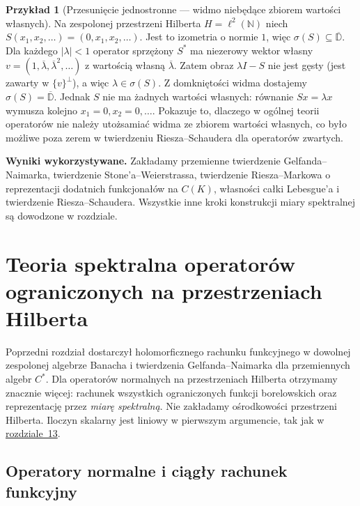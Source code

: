 \documentclass[11pt,a4paper]{article}
\numberwithin{equation}{section}
\theoremstyle{plain}
\theoremstyle{definition}
\newtheorem{przyklad}[twierdzenie]{Przykład}
\theoremstyle{remark}
\newcommand{\N}{\mathbb N}
\begin{document}
\begin{przyklad}[Przesunięcie jednostronne — widmo niebędące zbiorem wartości własnych]
\label{ex:unilateral-shift31}
Na zespolonej przestrzeni Hilberta $H=\ell^2(\N)$ niech
$S(x_1,x_2,\ldots)=(0,x_1,x_2,\ldots)$.
Jest to izometria o normie $1$, więc $\sigma(S)\subseteq\overline{\mathbb D}$.
Dla każdego $|\lambda|<1$ operator sprzężony $S^*$ ma niezerowy
wektor własny $v=(1,\overline\lambda,\overline\lambda^2,\ldots)$
z wartością własną $\overline\lambda$.
Zatem obraz $\lambda I-S$ nie jest gęsty (jest zawarty w
$\{v\}^\perp$), a więc $\lambda\in\sigma(S)$.
Z domkniętości widma dostajemy $\sigma(S)=\overline{\mathbb D}$.
Jednak $S$ nie ma żadnych wartości własnych: równanie $Sx=\lambda x$
wymusza kolejno $x_1=0,x_2=0,\ldots$.
Pokazuje to, dlaczego w ogólnej teorii operatorów nie należy
utożsamiać widma ze zbiorem wartości własnych, co było możliwe
poza zerem w twierdzeniu Riesza--Schaudera dla operatorów zwartych.
\end{przyklad}


\setcounter{section}{31}
\noindent\textbf{Wyniki wykorzystywane.} Zakładamy przemienne twierdzenie Gelfanda--Naimarka, twierdzenie Stone'a--Weierstrassa, twierdzenie Riesza--Markowa o reprezentacji dodatnich funkcjonałów na $C(K)$, własności całki Lebesgue'a i twierdzenie Riesza--Schaudera. Wszystkie inne kroki konstrukcji miary spektralnej są dowodzone w rozdziale.\par\medskip
\section{Teoria spektralna operatorów ograniczonych na przestrzeniach Hilberta}
\label{sec:spectral-hilbert32}

Poprzedni rozdział dostarczył holomorficznego rachunku funkcyjnego
w dowolnej zespolonej algebrze Banacha i twierdzenia Gelfanda--Naimarka
dla przemiennych algebr $C^*$. Dla operatorów normalnych na przestrzeniach
Hilberta otrzymamy znacznie więcej: rachunek wszystkich ograniczonych
funkcji borelowskich oraz reprezentację przez \emph{miarę spektralną}.
Nie zakładamy ośrodkowości przestrzeni Hilberta. Iloczyn skalarny jest
liniowy w pierwszym argumencie, tak jak w \hyperref[sec:hilbert13]{rozdziale~13}.

\subsection{Operatory normalne i ciągły rachunek funkcyjny}
\end{document}
